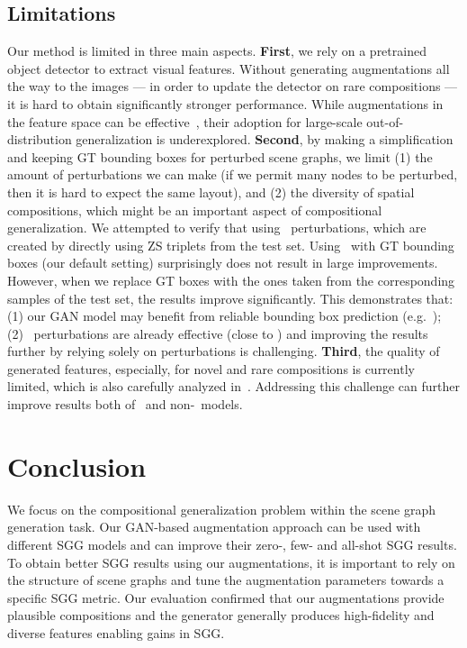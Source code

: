 \subsection{Limitations\label{sec:nolimit}}
\vspace{-3pt}
Our method is limited in three main aspects. \textbf{First}, we rely on a pretrained object detector to extract visual features. Without generating augmentations all the way to the images --- in order to update the detector on rare compositions --- it is hard to obtain significantly stronger performance. While augmentations in the feature space can be effective~\citep{devries2017dataset, verma2019manifold}, their adoption for large-scale out-of-distribution generalization is underexplored. 
\textbf{Second}, by making a simplification and keeping GT bounding boxes for perturbed scene graphs, we limit (1) the amount of perturbations we can make (if we permit many nodes to be perturbed, then it is hard to expect the same layout), and (2) the diversity of spatial compositions, which might be an important aspect of compositional generalization. 
We attempted to verify that using \oracle~perturbations, which are created by directly using ZS triplets from the test set.
Using \oracle~with GT bounding boxes (our default setting) surprisingly does not result in large improvements. However, when we replace GT boxes with the ones taken from the corresponding samples of the test set, the results improve significantly.
This demonstrates that: (1) our GAN model may benefit from reliable bounding box prediction (e.g.~\citep{hong2018inferring}); (2) \structn~perturbations are already effective (close to \oracle) and improving the results further by relying solely on perturbations is challenging.
\textbf{Third}, the quality of generated features, especially, for novel and rare compositions is currently limited, which is also carefully analyzed in~\citep{casanova2020generating}. Addressing this challenge can further improve results both of \oracle~and non-\oracle~models.

\vspace{-3pt}
\section{Conclusion}
\vspace{-5pt}
We focus on the compositional generalization problem within the scene graph generation task. Our GAN-based augmentation approach can be used with different SGG models and can improve their zero-, few- and all-shot SGG results. To obtain better SGG results using our augmentations, it is important to rely on the structure of scene graphs and tune the augmentation parameters towards a specific SGG metric. Our evaluation confirmed that our augmentations provide plausible compositions and the generator generally produces high-fidelity and diverse features enabling gains in SGG.
